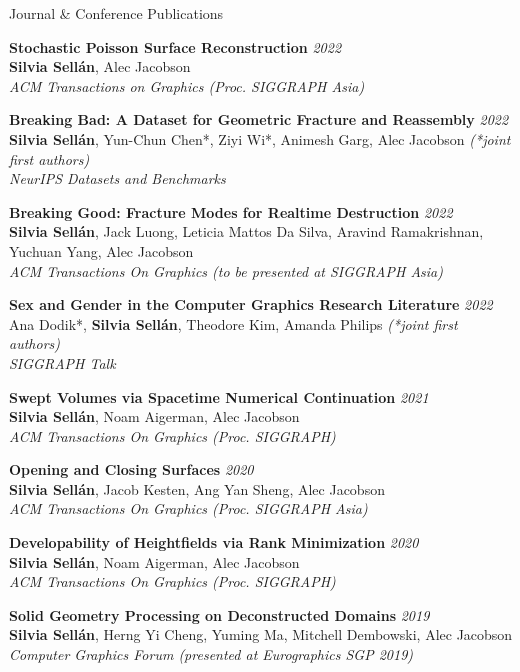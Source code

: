 \documentclass{resume}
\newcommand{\publication}[5]{
    {\bf #1} \hfill {\em \small #2} \\ %
    {\small#3}{\small \bf Silvia Sell\'{a}n}{\small #4} \\ %
    {\small \it #5} %
}
\begin{document}
\begin{rSection}{Journal \& Conference Publications}

\publication{Stochastic Poisson Surface Reconstruction}{2022}{}{, Alec Jacobson}{ACM Transactions on Graphics (Proc. SIGGRAPH Asia)}

\publication{Breaking Bad: A Dataset for Geometric Fracture and Reassembly}{2022}{}{*, Yun-Chun Chen*, Ziyi Wi*, Animesh Garg, Alec Jacobson  \textit{(*joint first authors)}}{NeurIPS Datasets and Benchmarks}

\publication{Breaking Good: Fracture Modes for Realtime Destruction}{2022}{}{, Jack Luong, Leticia Mattos Da Silva, Aravind Ramakrishnan, Yuchuan Yang, Alec Jacobson}{ACM Transactions On Graphics (to be presented at SIGGRAPH Asia)}

\publication{Sex and Gender in the Computer Graphics Research Literature}{2022}{Ana Dodik*, }{*, Theodore Kim, Amanda Philips \textit{(*joint first authors)}}{SIGGRAPH Talk}

\publication{Swept Volumes via Spacetime Numerical Continuation}{2021}{}{, Noam Aigerman, Alec Jacobson}{ACM Transactions On Graphics (Proc. SIGGRAPH)}

\publication{Opening and Closing Surfaces}{2020}{}{, Jacob Kesten, Ang Yan Sheng, Alec Jacobson}{ACM Transactions On Graphics (Proc. SIGGRAPH Asia)}

\publication{Developability of Heightfields via Rank Minimization}{2020}{}{, Noam Aigerman, Alec Jacobson}{ACM Transactions On Graphics (Proc. SIGGRAPH)}

\publication{Solid Geometry Processing on Deconstructed Domains}{2019}{}{, Herng Yi Cheng, Yuming Ma, Mitchell Dembowski, Alec Jacobson}{Computer Graphics Forum (presented at Eurographics SGP 2019)}
\end{rSection}
\end{document}
